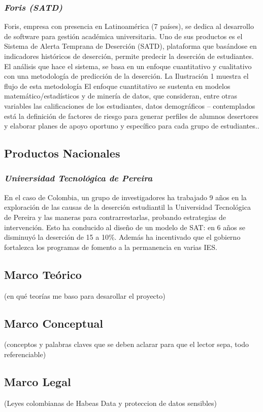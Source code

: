   \subsubsection{\textit{Foris (SATD)}}
  Foris, empresa con presencia en Latinoamérica (7 países), se dedica al desarrollo de software para gestión académica universitaria. Uno de sus productos es el Sistema de Alerta Temprana de Deserción (SATD), plataforma que basándose en indicadores históricos de deserción, permite predecir la deserción de estudiantes. El análisis que hace el sistema, se basa en un enfoque cuantitativo y cualitativo con una metodología de predicción de la deserción. La Ilustración 1 muestra el flujo de
  esta metodología
  El enfoque cuantitativo se sustenta en modelos matemático/estadísticos y de minería de datos, que consideran, entre otras variables las calificaciones de los estudiantes, datos demográficos – contemplados está la definición de factores de riesgo para generar perfiles de alumnos desertores y elaborar planes de apoyo oportuno y específico para cada grupo de estudiantes.\cite{SATPaper}.
 

 \subsection{Productos Nacionales}
   \subsubsection{\textit{Universidad Tecnológica de Pereira}}
 En el caso de Colombia, un grupo de investigadores ha trabajado 9 años en la exploración de las causas de la deserción estudiantil la Universidad Tecnológica de Pereira y las maneras para contrarrestarlas, probando estrategias de intervención. Esto ha conducido al diseño de un modelo de SAT: en 6 años se disminuyó la deserción de 15 a 10\%. Además ha incentivado que el gobierno fortalezca los programas de fomento a la permanencia en varias IES. \cite{carvajal}
 
\subsection{Marco Teórico}
(en qué teorías me baso para desarollar el proyecto)
\subsection{Marco Conceptual}
(conceptos y palabras claves que se deben aclarar para que el lector sepa, todo referenciable)
\subsection{Marco Legal}
(Leyes colombianas de Habeas Data y proteccion de datos sensibles)
